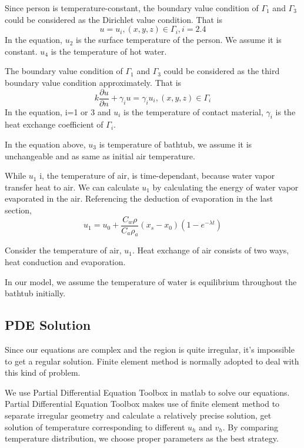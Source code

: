 \documentclass[12pt,a4paper,titlepage]{article}
\begin{document}
Since person is temperature-constant, the boundary value condition of ${\Gamma}_1$ and ${\Gamma}_3$ could be considered
as the Dirichlet value condition. That is
\begin{equation}
 u=u_i, (x,y,z)\in {\Gamma}_i, i=2.4
\end{equation}
In the equation, $u_2$ is the surface temperature of the person. We assume it is constant. $u_4$ is the temperature of hot water.

The boundary value condition of ${\Gamma}_1$ and ${\Gamma}_3$ could be considered as the third boundary value condition approximately. That is
\begin{equation}
 k\frac{\partial u}{\partial n}+{{\gamma}_i}u={{\gamma}_i}{u_i}, (x,y,z)\in {\Gamma}_i
\end{equation}
In the equation, i=1 or 3 and $u_i$ is the temperature of contact material,
${\gamma}_i$ is the heat exchange coefficient of ${\Gamma}_i$.

In the equation above, $u_3$ is temperature of bathtub, we assume it is unchangeable and as same as initial air temperature.

While $u_1$ i, the temperature of air, is time-dependant, because water vapor transfer heat to air. We can calculate $u_1$ by calculating the energy of water vapor evaporated in the air. Referencing the deduction of evaporation in the last section,
\begin{equation}
  u_1=u_0+\frac{C_w\rho}{C_a{{\rho}_a}} (x_s-x_0)(1-e^{-\lambda t})
\end{equation}

Consider the temperature of air, $u_1$. Heat exchange of air consists of two ways, heat conduction and evaporation.

In our model, we assume the temperature of water is equilibrium throughout the bathtub initially.

\subsection{PDE Solution}
\label{sec:PDE solution}
Since our equations are complex and the region is quite irregular, it's impossible to get a regular solution. Finite element method is normally adopted to deal with this kind of problem.

We use Partial Differential Equation Toolbox in matlab to solve our equations. Partial Differential Equation Toolbox makes use of finite element method to separate irregular geometry and calculate a relatively precise solution, get solution of temperature corresponding to different $u_h$ and $v_h$. By comparing temperature distribution, we choose proper parameters as the best strategy.
\end{document}
